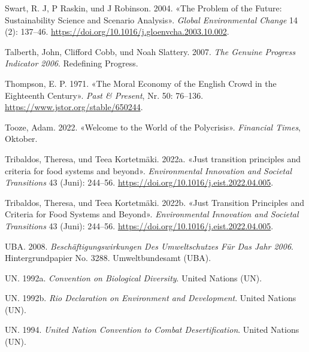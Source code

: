\documentclass[
  nswissgerman,
  a4paper,
  DIV=11,
  numbers=noendperiod,
  oneside,
  openany]{scrreprt}
\newlength{\cslhangindent}
\newenvironment{CSLReferences}[2] %
 {\begin{list}{}{%
  \setlength{\itemindent}{0pt}
  \setlength{\leftmargin}{0pt}
  \setlength{\parsep}{0pt}
  \ifodd #1
   \setlength{\leftmargin}{\cslhangindent}
   \setlength{\itemindent}{-1\cslhangindent}
  \fi
  \setlength{\itemsep}{#2\baselineskip}}}
 {\end{list}}
\begin{document}
\begin{CSLReferences}{1}{1}
Swart, R. J, P Raskin, und J Robinson. 2004. {«The Problem of the
Future: Sustainability Science and Scenario Analysis»}. \emph{Global
Environmental Change} 14 (2): 137--46.
\url{https://doi.org/10.1016/j.gloenvcha.2003.10.002}.

Talberth, John, Clifford Cobb, und Noah Slattery. 2007. \emph{The
{Genuine Progress Indicator} 2006}. Redefining Progress.

Thompson, E. P. 1971. {«The {Moral Economy} of the {English Crowd} in
the {Eighteenth Century}»}. \emph{Past \& Present}, Nr. 50: 76--136.
\url{https://www.jstor.org/stable/650244}.

Tooze, Adam. 2022. {«Welcome to the World of the Polycrisis»}.
\emph{Financial Times}, Oktober.

Tribaldos, Theresa, und Teea Kortetmäki. 2022a. {«Just transition
principles and criteria for food systems and beyond»}.
\emph{Environmental Innovation and Societal Transitions} 43 (Juni):
244--56. \url{https://doi.org/10.1016/j.eist.2022.04.005}.

Tribaldos, Theresa, und Teea Kortetmäki. 2022b. {«Just Transition
Principles and Criteria for Food Systems and Beyond»}.
\emph{Environmental Innovation and Societal Transitions} 43 (Juni):
244--56. \url{https://doi.org/10.1016/j.eist.2022.04.005}.

UBA. 2008. \emph{Beschäftigungswirkungen Des {Umweltschutzes} Für Das
{Jahr} 2006}. Hintergrundpapier No. 3288. Umweltbundesamt (UBA).

UN. 1992a. \emph{Convention on {Biological Diversity}}. United Nations
(UN).

UN. 1992b. \emph{Rio {Declaration} on {Environment} and {Development}}.
United Nations (UN).

UN. 1994. \emph{United {Nation Convention} to {Combat Desertification}}.
United Nations (UN).


\end{CSLReferences}
\end{document}
